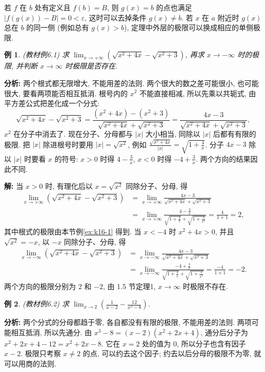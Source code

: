 \documentclass[UTF8,openany]{ctexbook}
\theoremstyle{chinesetextbook}
\newtheorem{example}{例}[section]
\newenvironment{cnsolution}{\par\indent\textbf{解:} \ignorespaces}{\par}
\begin{document}
若 $f$ 在 $b$ 处有定义且 $f(b)=B$, 则 $g(x)=b$ 的点也满足 $|f(g(x))-B|=0<\varepsilon$, 这时可以去掉条件 $g(x)\ne b$. 若 $x$ 在 $a$ 附近时 $g(x)$ 总在 $b$ 的同一侧 (例如总有 $g(x)>b$), 定理中外层的极限可以换成相应的单侧极限.
\begin{example}
\textnormal{(教材例6.1)} 求 $\displaystyle\lim_{x\to+\infty}\left(\sqrt{x^2+4x}-\sqrt{x^2+3}\right)$, 再求 $x\to-\infty$ 时的极限, 并判断 $x\to\infty$ 时极限是否存在.
\end{example}
\par\indent\textbf{分析:} 两个根式都无限增大, 不能用差的法则. 两个很大的数之差可能很小, 也可能很大, 要看两项能否相互抵消. 根号内的 $x^2$ 不能直接相减, 所以先乘以共轭式, 由平方差公式把差化成一个分式:
\[
\sqrt{x^2+4x}-\sqrt{x^2+3}=\frac{(x^2+4x)-(x^2+3)}{\sqrt{x^2+4x}+\sqrt{x^2+3}}=\frac{4x-3}{\sqrt{x^2+4x}+\sqrt{x^2+3}},
\]
$x^2$ 在分子中消去了. 现在分子、分母都与 $|x|$ 大小相当, 同除以 $|x|$ 后都有有限的极限. 把 $|x|$ 除进根号时要用 $|x|=\sqrt{x^2}$, 例如 $\displaystyle\frac{\sqrt{x^2+4x}}{|x|}=\sqrt{1+\frac4x}$. 分子 $4x-3$ 除以 $|x|$ 时要看 $x$ 的符号: $x>0$ 时得 $\displaystyle4-\frac3x$, $x<0$ 时得 $\displaystyle-4+\frac3x$. 两个方向的结果因此不同.
\begin{cnsolution}
当 $x>0$ 时, 有理化后以 $x=\sqrt{x^2}$ 同除分子、分母, 得
\[
\begin{aligned}
\lim_{x\to+\infty}\left(\sqrt{x^2+4x}-\sqrt{x^2+3}\right)
&=\lim_{x\to+\infty}\frac{4x-3}{\sqrt{x^2+4x}+\sqrt{x^2+3}}\\
&=\lim_{x\to+\infty}\frac{4-\frac3x}{\sqrt{1+\frac4x}+\sqrt{1+\frac3{x^2}}}=\frac4{1+1}=2,
\end{aligned}
\]
其中根式的极限由本节例\ref{ex:k16-1} 得到. 当 $x<-4$ 时 $x^2+4x>0$, 并且 $\sqrt{x^2}=-x$, 以 $-x$ 同除分子、分母, 得
\[
\begin{aligned}
\lim_{x\to-\infty}\left(\sqrt{x^2+4x}-\sqrt{x^2+3}\right)
&=\lim_{x\to-\infty}\frac{4x-3}{\sqrt{x^2+4x}+\sqrt{x^2+3}}\\
&=\lim_{x\to-\infty}\frac{-4+\frac3x}{\sqrt{1+\frac4x}+\sqrt{1+\frac3{x^2}}}=\frac{-4}{1+1}=-2.
\end{aligned}
\]
两个方向的极限分别为 $2$ 和 $-2$, 由 1.5 节定理1, $x\to\infty$ 时极限不存在.
\end{cnsolution}
\begin{example}\label{ex:6-2}
\textnormal{(教材例6.2)} 求 $\displaystyle\lim_{x\to2}\left(\frac1{x-2}-\frac{12}{x^3-8}\right)$.
\end{example}
\par\indent\textbf{分析:} 两个分式的分母都趋于零, 各自都没有有限的极限, 不能用差的法则. 两项可能相互抵消, 所以先通分. 由 $x^3-8=(x-2)(x^2+2x+4)$, 通分后分子为 $x^2+2x+4-12=x^2+2x-8$. 它在 $x=2$ 处的值为 $0$, 所以分子也含有因子 $x-2$. 极限只考察 $x\ne2$ 的点, 可以约去这个因子; 约去以后分母的极限不为零, 就可以用商的法则.
\end{document}
